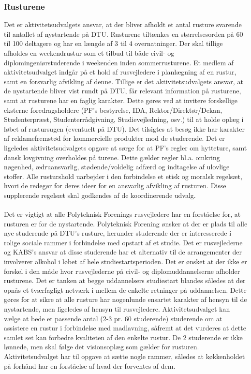 \subsubsection{Rusturene}
Det er aktivitetsudvalgets ansvar, at der bliver afholdt et antal rusture svarende til antallet af nystartende på DTU. Rusturene tiltænkes en størrelsesorden på 60 til 100 deltagere og har en længde af 3 til 4 overnatninger. Der skal tillige afholdes en weekendrustur som et tilbud til både civil- og diplomingeniørstuderende i weekenden inden sommerrusturene. Et medlem af aktivitetsudvalget indgår på et hold af rusvejledere i planlægning af en rustur, samt en forsvarlig afvikling af denne. Tillige er det aktivitetsudvalgets ansvar, at de nystartende bliver vist rundt på DTU, får relevant information på rusturene, samt at rusturene har en faglig karakter. Dette gøres ved at invitere forskellige eksterne foredragsholdere (PF’s bestyrelse, IDA, Rektor/Direktør/Dekan, Studenterpræst, Studenterrådgivning, Studievejledning, osv.) til at holde oplæg i løbet af rustursugen (eventuelt på DTU). Det tilsigtes at besøg ikke har karakter af reklamefremstød for kommercielle produkter mod de studerende. Det er ligeledes aktivitetsudvalgets opgave at sørge for at PF’s regler om hytteture, samt dansk lovgivning overholdes på turene. Dette gælder regler bl.a. omkring nøgenhed, ædruansvarlig, stødende/voldelig adfærd og indtagelse af ulovlige stoffer. Alle rusturshold uarbejder i den forbindelse et etisk og moralsk regelsæt, hvori de redegør for deres ideer for en ansvarlig afvikling af rusturen. Disse supplerende regelsæt skal godkendes af de koordinerende udvalg.\\
\\
Det er vigtigt at alle Polyteknisk Forenings rusvejledere har en forståelse for, at rusturen er for de nystartende. Polyteknisk Forening ønsker at der er plads til alle nye studerende på DTU’s rusture, herunder studerende der er interesserede i rolige sociale rammer i forbindelse med opstart af et studie. Det er rusvejlederne og KABS’s ansvar at disse studerende har et
alternativ til de arrangementer der involverer alkohol i løbet af hele studiestartsperioden. Det er ønsket at der ikke er forskel i den måde hvor rusvejlederne på civil- og diplomuddannelserne afholder rusturene. Det er tanken at begge uddannelsers studiestart blandes således at der opnås et tværfagligt netværk i mellem de enkelte retninger på uddannelsen. Dette gøres for at sikre at alle rusture har nogenlunde ensartet karakter af hensyn til de nystartende, men ligeledes af hensyn til rusvejledere. Aktivitetsudvalget kan vælge at bede et passende antal (2-3 pr. 60 studerende) studerende om at assistere en rustur i forbindelse med madlavning, såfremt at det vurderes at dette samlet set kan forbedre kvaliteten af den enkelte rustur. De 2 studerende er ikke lønnede, men skal følge det visionsoplæg som gælder for rusturen. Aktivitetsudvalget har til opgave at sætte nogle rammer, således at køkkenholdet på forhånd har en forståelse af hvad der forventes af dem.

